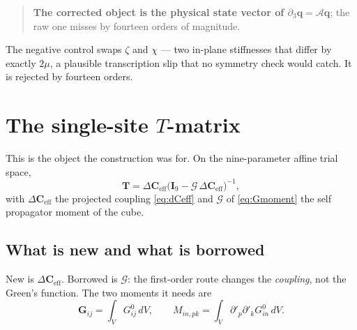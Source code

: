 \documentclass[11pt,a4paper]{article}
\newcommand{\bI}{\mathbf{I}}
\newcommand{\bq}{\mathbf{q}}
\newcommand{\bG}{\mathbf{G}}
\newcommand{\Aop}{\mathcal{A}}
\newcommand{\dCeff}{\Delta\mathbf{C}_{\mathrm{eff}}}
\begin{document}
\begin{quote}
\textbf{The corrected object is the physical state vector of
$\partial_3\bq = \Aop\bq$}; the raw one misses by fourteen orders of magnitude.
\end{quote}

The negative control swaps $\zeta$ and $\chi$ --- two in-plane stiffnesses that
differ by exactly $2\mu$, a plausible transcription slip that no symmetry check
would catch.  It is rejected by fourteen orders.

\section{The single-site \texorpdfstring{$T$}{T}-matrix}\label{sec:tmatrix}

This is the object the construction was for.  On the nine-parameter affine
trial space,
\begin{equation}\label{eq:T}
  \boxed{\ \mathbf{T} = \dCeff\bigl(\bI_9 - \mathcal{G}\,\dCeff\bigr)^{-1}, \ }
\end{equation}
with $\dCeff$ the projected coupling \eqref{eq:dCeff} and $\mathcal{G}$ of \eqref{eq:Gmoment}
the self propagator moment of the cube.

\subsection{What is new and what is borrowed}

New is $\dCeff$.  Borrowed is $\mathcal{G}$: the first-order route changes the
\emph{coupling}, not the Green's function.  The two moments it needs are
\begin{equation}\label{eq:selfmoments}
  \bG_{ij} = \int_V G^0_{ij}\,dV,
  \qquad
  M_{in,pk} = \int_V \partial'_p\partial'_k G^0_{in}\,dV .
\end{equation}
\end{document}
